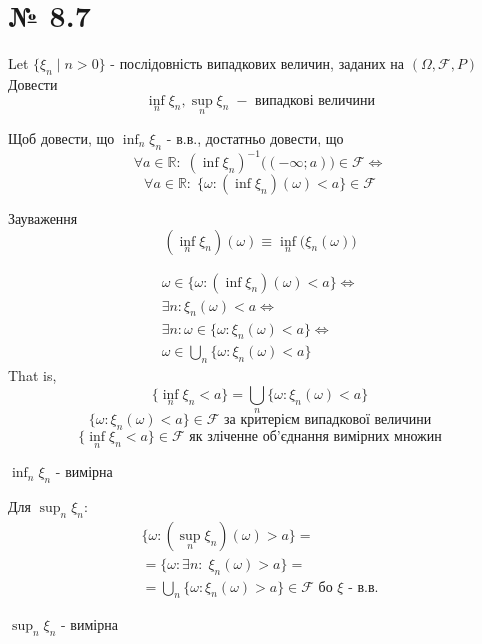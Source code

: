\documentclass[11pt, a4paper]{article} %
\begin{document}

\section*{№ 8.7}

\begin{mdframed}
    Let $\{\xi_n\;|\;n>0\}$ - послідовність випадкових величин, заданих
    на $(\Omega, \mathcal{F}, P)$\\
    Довести
    $$\inf_n \xi_n, \sup_n \xi_n \;- \text{ випадкові величини}$$
\end{mdframed}

Щоб довести, що $\displaystyle \inf_n \xi_n$ - в.в., достатньо довести, що 
$$
\forall a\in\mathbb R:\; \left(\inf \xi_n\right)^{-1} \bigl((-\infty;a)\bigr) \in \mathcal F \iff
$$
$$
\forall a\in\mathbb R:\; \{\omega : \left(\inf \xi_n\right)(\omega) < a\} \in \mathcal{F}
$$

\begin{mdframed}
    Зауваження
    $$\left(\inf_n \xi_n\right)(\omega) \equiv \inf_n \bigl(\xi_n(\omega)\bigr)$$
\end{mdframed}


$$
\begin{gathered}
    \omega \in \{ \omega : \left(\inf \xi_n\right)(\omega) < a \} \iff \\
    \exists n : \xi_n(\omega) < a \iff \\
    \exists n: \omega \in \{\omega : \xi_n(\omega) < a \} \iff \\
    \omega \in \bigcup_n \{\omega : \xi_n(\omega) < a \} 
\end{gathered}
$$
That is,
$$\{\inf_n \xi_n < a\} = \bigcup_n \{\omega : \xi_n(\omega) < a \}$$
$$
\{\omega : \xi_n(\omega) < a\} \in \mathcal F \text{ за критерієм випадкової величини} 
$$
$$
\{\inf_n \xi_n < a\} \in \mathcal F \text{ як зліченне об'єднання вимірних множин}
$$

\begin{mdframed}[style=ans]
    $\displaystyle \inf_n \xi_n$ - вимірна
\end{mdframed}

Для $\displaystyle \sup_n \xi_n$:
$$
\begin{gathered}
    \{\omega : \left(\sup_n \xi_n\right)(\omega) > a\} = \\
    = \{\omega : \exists n:\; \xi_n(\omega) > a\} = \\
    = \bigcup_n \{\omega : \xi_n(\omega) > a\} \in \mathcal{F} \text{ бо $\xi$ - в.в.}
\end{gathered}
$$
\begin{mdframed}[style=ans]
    $\displaystyle \sup_n \xi_n$ - вимірна
\end{mdframed}
\pagebreak
\end{document}
